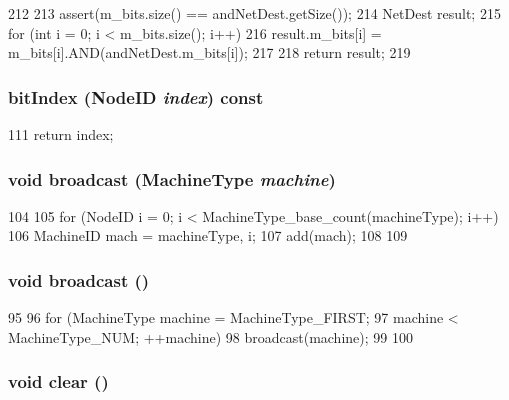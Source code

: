 \begin{DoxyCode}
212 {
213     assert(m_bits.size() == andNetDest.getSize());
214     NetDest result;
215     for (int i = 0; i < m_bits.size(); i++) {
216         result.m_bits[i] = m_bits[i].AND(andNetDest.m_bits[i]);
217     }
218     return result;
219 }
\end{DoxyCode}
\hypertarget{classNetDest_a2e3a5424526ce278ba80f77e8066de05}{
\subsubsection[{bitIndex}]{ bitIndex ({\bf NodeID} {\em index}) const}}
\label{classNetDest_a2e3a5424526ce278ba80f77e8066de05}



\begin{DoxyCode}
111 { return index; }
\end{DoxyCode}
\hypertarget{classNetDest_a32f4d06bc79cf19c91c4866f25abe500}{
\subsubsection[{broadcast}]{\setlength{\rightskip}{0pt plus 5cm}void broadcast (MachineType {\em machine})}}
\label{classNetDest_a32f4d06bc79cf19c91c4866f25abe500}



\begin{DoxyCode}
104 {
105     for (NodeID i = 0; i < MachineType_base_count(machineType); i++) {
106         MachineID mach = {machineType, i};
107         add(mach);
108     }
109 }
\end{DoxyCode}
\hypertarget{classNetDest_a299d89c50484c4d3a597f6b43b65e21c}{
\subsubsection[{broadcast}]{\setlength{\rightskip}{0pt plus 5cm}void broadcast ()}}
\label{classNetDest_a299d89c50484c4d3a597f6b43b65e21c}



\begin{DoxyCode}
95 {
96     for (MachineType machine = MachineType_FIRST;
97          machine < MachineType_NUM; ++machine) {
98         broadcast(machine);
99     }
100 }
\end{DoxyCode}
\hypertarget{classNetDest_ac8bb3912a3ce86b15842e79d0b421204}{
\subsubsection[{clear}]{\setlength{\rightskip}{0pt plus 5cm}void clear ()}}
\label{classNetDest_ac8bb3912a3ce86b15842e79d0b421204}




